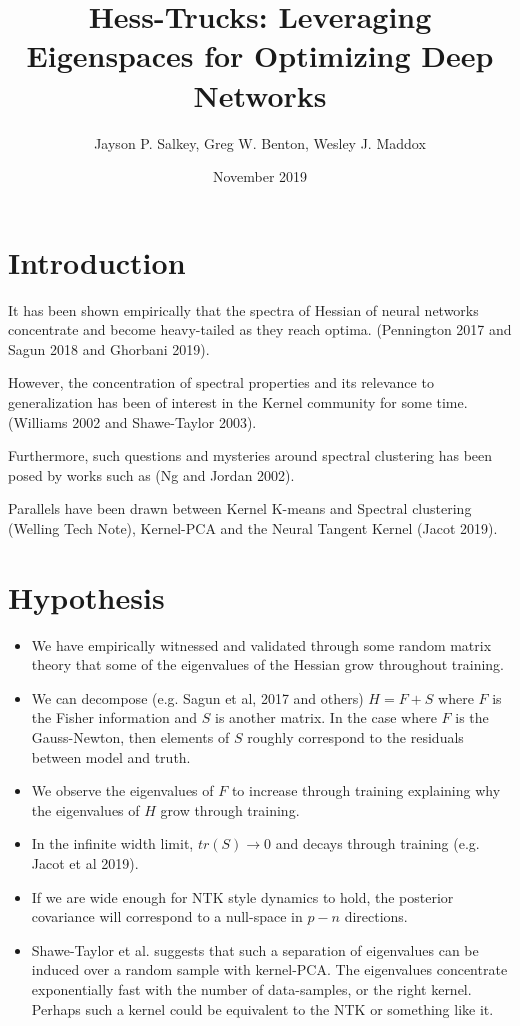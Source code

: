 \documentclass{article}
\title{Hess-Trucks: Leveraging Eigenspaces for Optimizing Deep Networks}
\author{Jayson P. Salkey, Greg W. Benton, Wesley J. Maddox}
\date{November 2019}
\begin{document}
\maketitle

\section{Introduction}
It has been shown empirically that the spectra of Hessian of neural networks concentrate and become heavy-tailed as they reach optima. (Pennington 2017 and Sagun 2018 and Ghorbani 2019).

However, the concentration of spectral properties and its relevance to generalization has been of interest in the Kernel community for some time. (Williams 2002 and Shawe-Taylor 2003).

Furthermore, such questions and mysteries around spectral clustering has been posed by works such as (Ng and Jordan 2002).

Parallels have been drawn between Kernel K-means and Spectral clustering (Welling Tech Note), Kernel-PCA and the Neural Tangent Kernel (Jacot 2019).

\section{Hypothesis}
\begin{itemize}
	\item  We have empirically witnessed and validated through some random matrix theory that some of the eigenvalues of the Hessian grow throughout training. 
	\item We can decompose (e.g. Sagun et al, 2017 and others) $H = F + S$ where $F$ is the Fisher information and $S$ is another matrix.
	\subitem In the case where $F$ is the Gauss-Newton, then elements of $S$ roughly correspond to the residuals between model and truth.
	\item We observe the eigenvalues of $F$ to increase through training explaining why the eigenvalues of $H$ grow through training.
	\item In the infinite width limit, $tr(S) \rightarrow 0$ and decays through training (e.g. Jacot et al 2019).
	\item If we are wide enough for NTK style dynamics to hold, the posterior covariance will correspond to a null-space in $p-n$ directions.
	\item Shawe-Taylor et al. suggests that such a separation of eigenvalues can be induced over a random sample with kernel-PCA. The eigenvalues concentrate exponentially fast with the number of data-samples, or the right kernel.
	\subitem Perhaps such a kernel could be equivalent to the NTK or something like it.
\end{itemize}
\end{document}
